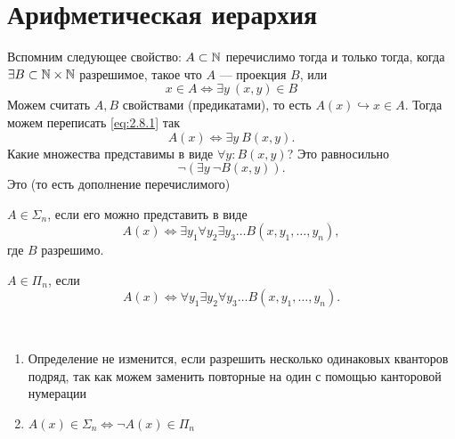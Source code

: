 \section{Арифметическая иерархия}

Вспомним следующее свойство:
	$ A \subset \mathbb{N}$ перечислимо тогда и только тогда, когда $\exists  B \subset \mathbb{N} \times \mathbb{N}$ разрешимое, такое что $ A$ --- проекция $ B$,
	или 
	\begin{equation}\label{eq:2.8.1}
	x \in A \Longleftrightarrow \exists  y ~ (x, y) \in  B
	\end{equation}
Можем считать $ A, B$ свойствами (предикатами), то есть  
$ A(x) \hookrightarrow x \in A  $.
Тогда можем переписать \ref{eq:2.8.1} так
\[
    A(x) \Longleftrightarrow \exists y ~ B(x, y)
.\] 
Какие множества представимы в виде $ \forall y \colon B(x, y)$? Это равносильно
\[
    \neg \left( \exists  y ~ \neg B(x, y) \right) 
.\] 
Это  (то есть дополнение перечислимого)

\begin{defn}
    $ A \in \Sigma_{n} $, если его можно представить в виде 
    \[
	A(x) \Longleftrightarrow \exists y_1 \forall y_2 \exists y_3 \ldots B(x, y_1, \ldots , y_{n})
    ,\] 
    где $ B$ разрешимо.

	\noindent
     $ A \in \Pi_{n}$, если
     \[
	 A(x) \Longleftrightarrow \forall y_1 \exists y_2 \forall y_3 \ldots B(x, y_1, \ldots , y_{n})
     .\] 
\end{defn}

\begin{prop}
    ~\begin{enumerate}
        \item Определение не изменится, если разрешить несколько одинаковых кванторов подряд, так как можем заменить повторные на один с помощью канторовой нумерации
	\item $ A(x) \in  \Sigma _{n} \Longleftrightarrow \neg A(x) \in \Pi_{n}$
    \end{enumerate}
\end{prop}

